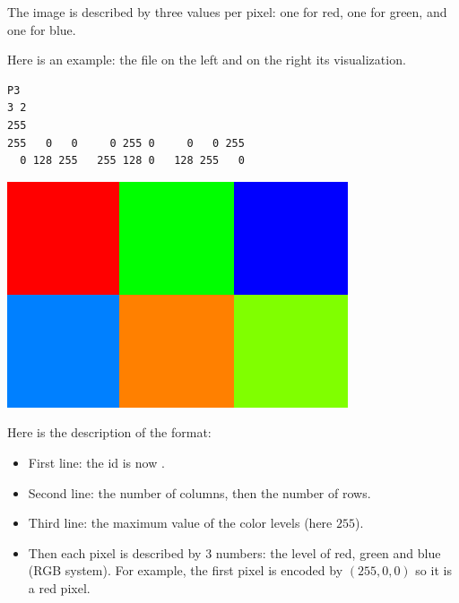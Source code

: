 \documentclass[11pt,class=report,crop=false]{standalone}
\begin{document}
\begin{cours}
The image is described by three values per pixel: one for red, one for green, and one for blue.

Here is an example: the file  on the left and on the right its visualization.
\begin{center}
\begin{minipage}{0.6\textwidth}
\begin{lstlisting}
P3
3 2
255
255   0   0     0 255 0     0   0 255
  0 128 255   255 128 0   128 255   0
\end{lstlisting}
\end{minipage}
\begin{minipage}{0.3\textwidth}
\includegraphics[scale=\myscale,scale=0.2]{screen-lesson-image_coul}
\end{minipage}
\end{center}

Here is the description of the format:
\begin{itemize}
  \item First line: the id is now .
  \item Second line: the number of columns, then the number of rows.
  \item Third line: the maximum value of the color levels (here $255$).
  \item Then each pixel is described by $3$ numbers: the level of red, green and blue (RGB system). For example, the first pixel is encoded by $(255,0,0)$ so it is a red pixel.
\end{itemize} 


\end{cours}


\end{document}
